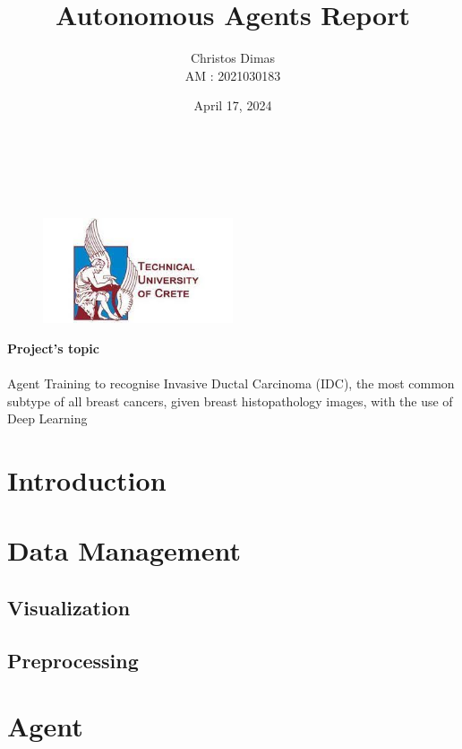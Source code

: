 \documentclass[11pt]{article}
\title{\textbf{Autonomous Agents Report}}
\author{Christos Dimas \\ AM : 2021030183}
\date{April 17, 2024 \\~\\~\\~\\}
\begin{document}
\begin{figure}[t]
    \centering
    \includegraphics[width=0.5\textwidth]{Images/tuc_image.png}
\end{figure}

\maketitle

\begin{center}
    \textbf{Project's topic}\\~\\
    Agent Training to recognise Invasive Ductal Carcinoma (IDC), the most common subtype of all breast cancers, given breast histopathology images, with the use of Deep Learning
\end{center}

\newpage
\tableofcontents

\newpage

\section{Introduction}


\section{Data Management}
\subsection{Visualization}


\subsection{Preprocessing}



\section{Agent}
\end{document}
